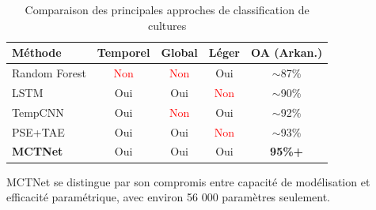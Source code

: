 \begin{table}[H]
\centering
\caption{Comparaison des principales approches de classification de cultures}
\label{tab:comparaison_approches}
\begin{tabular}{lcccc}
\toprule
\textbf{Méthode} & \textbf{Temporel} & \textbf{Global} & \textbf{Léger} & \textbf{OA (Arkan.)} \\
\midrule
Random Forest     & \textcolor{red}{Non}   & \textcolor{red}{Non}   & \textcolor{green!60!black}{Oui} & $\sim$87\%  \\
LSTM              & \textcolor{green!60!black}{Oui}  & \textcolor{green!60!black}{Oui}  & \textcolor{red}{Non}   & $\sim$90\%  \\
TempCNN           & \textcolor{green!60!black}{Oui}  & \textcolor{red}{Non}   & \textcolor{green!60!black}{Oui} & $\sim$92\%  \\
PSE+TAE           & \textcolor{green!60!black}{Oui}  & \textcolor{green!60!black}{Oui}  & \textcolor{red}{Non}   & $\sim$93\%  \\
\textbf{MCTNet}   & \textcolor{green!60!black}{Oui}  & \textcolor{green!60!black}{Oui}  & \textcolor{green!60!black}{Oui} & \textbf{95\%+} \\
\bottomrule
\end{tabular}
\end{table}

MCTNet se distingue par son compromis entre capacité de modélisation et
efficacité paramétrique, avec environ 56 000 paramètres seulement.

\cleardoublepage
